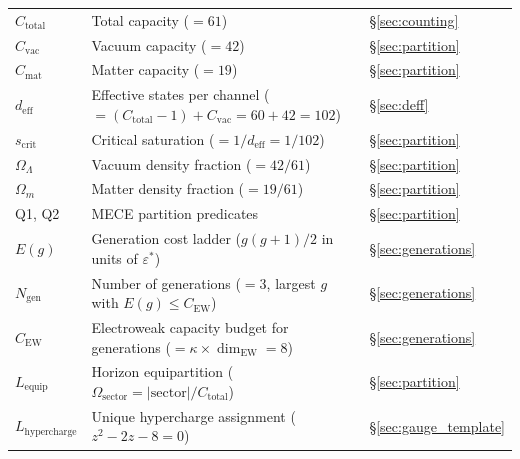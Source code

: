 \documentclass[11pt]{article}
\begin{document}
\begin{center}
\begin{tabular}{lp{8.5cm}l}
$C_{\mathrm{total}}$ & Total capacity ($= 61$) & \S\ref{sec:counting} \\
$C_{\mathrm{vac}}$ & Vacuum capacity ($= 42$) & \S\ref{sec:partition} \\
$C_{\mathrm{mat}}$ & Matter capacity ($= 19$) & \S\ref{sec:partition} \\
$d_{\mathrm{eff}}$ & Effective states per channel ($= (C_{\mathrm{total}}-1) + C_{\mathrm{vac}} = 60 + 42 = 102$) & \S\ref{sec:deff} \\
$s_{\mathrm{crit}}$ & Critical saturation ($= 1/d_{\mathrm{eff}} = 1/102$) & \S\ref{sec:partition} \\
$\Omega_\Lambda$ & Vacuum density fraction ($= 42/61$) & \S\ref{sec:partition} \\
$\Omega_m$ & Matter density fraction ($= 19/61$) & \S\ref{sec:partition} \\
Q1, Q2 & MECE partition predicates & \S\ref{sec:partition} \\
$E(g)$ & Generation cost ladder ($g(g+1)/2$ in units of $\varepsilon^*$) & \S\ref{sec:generations} \\
$N_{\mathrm{gen}}$ & Number of generations ($= 3$, largest $g$ with $E(g) \le C_{\mathrm{EW}}$) & \S\ref{sec:generations} \\
$C_{\mathrm{EW}}$ & Electroweak capacity budget for generations ($= \kappa \times \dim_{\mathrm{EW}} = 8$) & \S\ref{sec:generations} \\
$L_{\mathrm{equip}}$ & Horizon equipartition ($\Omega_{\mathrm{sector}} = |\mathrm{sector}|/C_{\mathrm{total}}$) & \S\ref{sec:partition} \\
$L_{\mathrm{hypercharge}}$ & Unique hypercharge assignment ($z^2 - 2z - 8 = 0$) & \S\ref{sec:gauge_template} \\
\bottomrule
\end{tabular}
\end{center}
\end{document}
